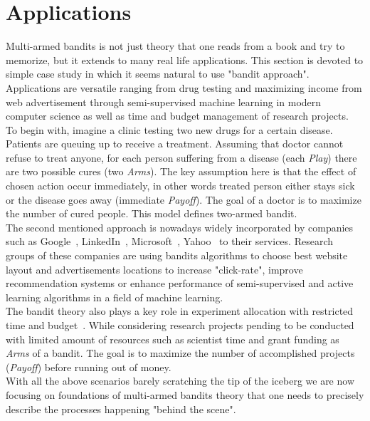 \documentclass[12pt, a4paper, pdflatex]{report}
\begin{document}
\section{Applications} %
Multi-armed bandits is not just theory that one reads from a book and try to memorize, but it extends to many real life applications. This section is devoted to simple case study in which it seems natural to use "bandit approach". Applications are versatile ranging from drug testing and maximizing income from web advertisement through semi-supervised machine learning in modern computer science as well as time and budget management of research projects.\\

To begin with, imagine a clinic testing two new drugs for a certain disease. Patients are queuing up to receive a treatment. Assuming that doctor cannot refuse to treat anyone, for each person suffering from a disease (each \emph{Play}) there are two possible cures (two \emph{Arms}). The key assumption here is that the effect of chosen action occur immediately, in other words treated person either stays sick or the disease goes away (immediate \emph{Payoff}). The goal of a doctor is to maximize the number of cured people. This model defines two-armed bandit.\\

The second mentioned approach is nowadays widely incorporated by companies such as Google~\cite{AYPSze12}\cite{ASMB:ASMB874}, LinkedIn~\cite{Tang:2013:AAF:2505515.2514700}, Microsoft~\cite{graepel2010web}, Yahoo~\cite{Li:2010:CAP:1772690.1772758} to their services. Research groups of these companies are using bandits algorithms to choose best website layout and advertisements locations to increase "click-rate", improve recommendation systems or enhance performance of semi-supervised and active learning algorithms in a field of machine learning.\\

The bandit theory also plays a key role in experiment allocation with restricted time and budget~\cite{gittins+glazebrook+weber}. While considering research projects pending to be conducted with limited amount of resources such as scientist time and grant funding as \emph{Arms} of a bandit. The goal is to maximize the number of accomplished projects (\emph{Payoff}) before running out of money.\\

With all the above scenarios barely scratching the tip of the iceberg we are now focusing on foundations of multi-armed bandits theory that one needs to precisely describe the processes happening "behind the scene".
\end{document}
